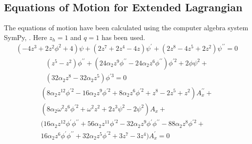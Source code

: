 \documentclass[12pt]{report}
\newcommand{\sympy}{SymPy}
\begin{document}
\begin{appendices}
\chapter{Equations of Motion for Extended Lagrangian}
The equations of motion have been calculated using the computer algebra system \sympy, \cite{sympy}. Here $z_h=1$ and $q=1$ has been used.
\begin{equation}
 \begin{split}
\left(- 4 z^{3} + 2 z^{2} \phi^2 + 4\right) \psi + \left(2 z^{7} + 2 z^{4} - 4 z\right) \psi^\prime + \left(2 z^{8} - 4 z^{5} + 2 z^{2}\right) \psi^{\prime\prime}=0
 \end{split}
\end{equation}
\vspace{1cm}
\begin{equation}
 \begin{split}
\left(z^{5} - z^{2}\right) \phi^{\prime\prime} + \left(24 \alpha_{2} z^{9} \phi^{\prime\prime} - 24 \alpha_{2} z^{6} \phi^{\prime\prime}\right) \phi^{\prime 2} + 2 \phi \psi^2+\\\left(32 \alpha_{2} z^{8} - 32 \alpha_{2} z^{5}\right) \phi^{\prime 3}=0
 \end{split}
\end{equation}
\vspace{1cm}
\begin{equation}
 \begin{split}
\left(8 \alpha_{2} z^{12} \phi^{\prime 2} - 16 \alpha_{2} z^{9} \phi^{\prime 2} + 8 \alpha_{2} z^{6} \phi^{\prime 2} + z^{8} - 2 z^{5} + z^{2}\right) A_x^{\prime\prime}+\\\left(8 \alpha_{2} \omega^{2} z^{6} \phi^{\prime 2} + \omega^{2} z^{2} + 2 z^{3} \psi^2 - 2 \psi^2\right) A_x+\\
\big(16 \alpha_{2} z^{12} \phi^\prime \phi^{\prime\prime} + 56 \alpha_{2} z^{11} \phi^{\prime 2} - 32 \alpha_{2} z^{9} \phi^\prime \phi^{\prime\prime} - 88 \alpha_{2} z^{8} \phi^{\prime 2} + \\
16 \alpha_{2} z^{6} \phi^\prime \phi^{\prime\prime} + 32 \alpha_{2} z^{5} \phi^{\prime 2} + 3 z^{7} - 3 z^{4}\big) A_x^\prime=0\\
 \end{split}
\end{equation}

\end{appendices}


\end{document}
